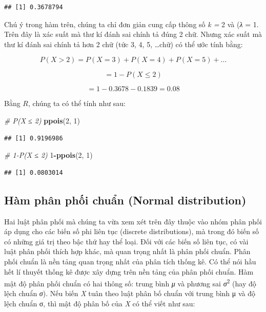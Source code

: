 \documentclass[
]{book}
\newenvironment{Shaded}{\begin{snugshade}}{\end{snugshade}}
\newcommand{\CommentTok}[1]{\textcolor[rgb]{0.56,0.35,0.01}{\textit{#1}}}
\newcommand{\DecValTok}[1]{\textcolor[rgb]{0.00,0.00,0.81}{#1}}
\newcommand{\KeywordTok}[1]{\textcolor[rgb]{0.13,0.29,0.53}{\textbf{#1}}}
\newcommand{\NormalTok}[1]{#1}
\newcommand{\OperatorTok}[1]{\textcolor[rgb]{0.81,0.36,0.00}{\textbf{#1}}}
\begin{document}
\begin{verbatim}
## [1] 0.3678794
\end{verbatim}

Chú ý trong hàm trên, chúng ta chỉ đơn giản cung cấp thông số \emph{k =} 2 và (\emph{λ} = 1. Trên đây là xác suất mà thư kí đánh sai chính tả đúng 2 chữ. Nhưng xác suất mà thư kí đánh sai chính tả hơn 2 chữ (tức 3, 4, 5, \ldots chữ) có thể ước tính bằng:

\[P\left( X > 2 \right) = P\left( X = 3 \right) + P\left( X = 4 \right) + P\left( X = 5 \right) + \ldots\]

\[= 1 - P\left( X \leq 2 \right)\]

\[= 1 - 0.3678 - 0.1839 = 0.08\]

Bằng \(R\), chúng ta có thể tính như sau:

\begin{Shaded}
\begin{Highlighting}[]
\CommentTok{\# P(X ≤ 2)}
\KeywordTok{ppois}\NormalTok{(}\DecValTok{2}\NormalTok{, }\DecValTok{1}\NormalTok{)}
\end{Highlighting}
\end{Shaded}

\begin{verbatim}
## [1] 0.9196986
\end{verbatim}

\begin{Shaded}
\begin{Highlighting}[]
\CommentTok{\# 1{-}P(X ≤ 2)}
\DecValTok{1}\OperatorTok{{-}}\KeywordTok{ppois}\NormalTok{(}\DecValTok{2}\NormalTok{, }\DecValTok{1}\NormalTok{)}
\end{Highlighting}
\end{Shaded}

\begin{verbatim}
## [1] 0.0803014
\end{verbatim}

\hypertarget{huxe0m-phuxe2n-phux1ed1i-chuux1ea9n-normal-distribution}{%
\subsection{Hàm phân phối chuẩn (Normal distribution)}\label{huxe0m-phuxe2n-phux1ed1i-chuux1ea9n-normal-distribution}}

Hai luật phân phối mà chúng ta vừa xem xét trên đây thuộc vào nhóm phân phối áp dụng cho các biến số phi liên tục (discrete distributions), mà trong đó biến số có những giá trị theo bậc thứ hay thể loại. Đối với các biến số liên tục, có vài luật phân phối thích hợp khác, mà quan trọng nhất là phân phối chuẩn. Phân phối chuẩn là nền tảng quan trọng nhất của phân tích thống kê. Có thể nói hầu hết lí thuyết thống kê được xây dựng trên nền tảng của phân phối chuẩn. Hàm mật độ phân phối chuẩn có hai thông số: trung bình \emph{μ} và phương sai \emph{σ}\textsuperscript{2} (hay độ lệch chuẩn \emph{σ}). Nếu biến \emph{X} tuân theo luật phân bố chuẩn với trung bình μ và độ lệch chuẩn σ, thì mật độ phân bố của \emph{X} có thể viết như sau:
\end{document}
